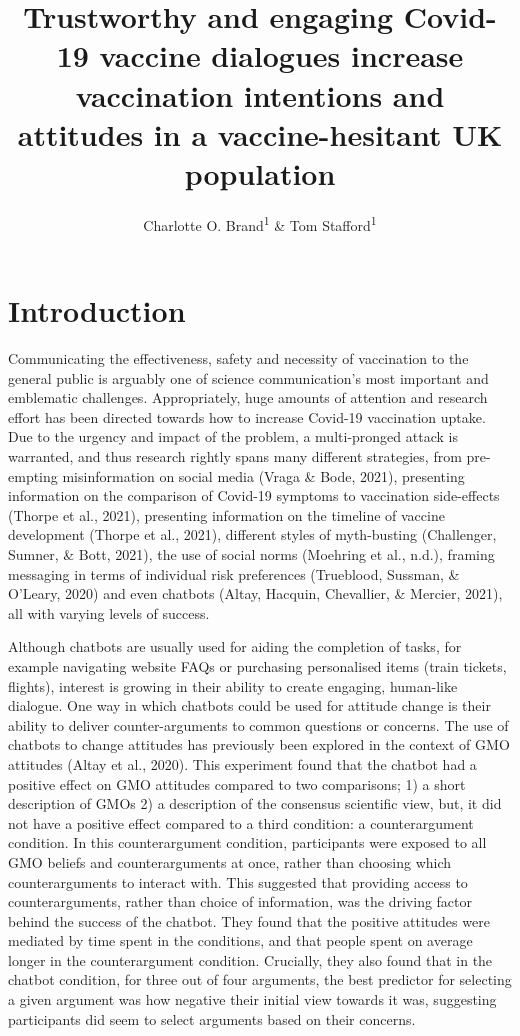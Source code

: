 \documentclass[
  english,
  ,jou,floatsintext]{apa6}
\title{Trustworthy and engaging Covid-19 vaccine dialogues increase vaccination intentions and attitudes in a vaccine-hesitant UK population}
\author{Charlotte O. Brand\textsuperscript{1} \& Tom Stafford\textsuperscript{1}}
\date{}
\affiliation{\vspace{0.5cm}\textsuperscript{1} University of Sheffield, Department of Psychology}
\begin{document}
\maketitle

\hypertarget{introduction}{%
\section{Introduction}\label{introduction}}

Communicating the effectiveness, safety and necessity of vaccination to the general public is arguably one of science communication's most important and emblematic challenges. Appropriately, huge amounts of attention and research effort has been directed towards how to increase Covid-19 vaccination uptake. Due to the urgency and impact of the problem, a multi-pronged attack is warranted, and thus research rightly spans many different strategies, from pre-empting misinformation on social media (Vraga \& Bode, 2021), presenting information on the comparison of Covid-19 symptoms to vaccination side-effects (Thorpe et al., 2021), presenting information on the timeline of vaccine development (Thorpe et al., 2021), different styles of myth-busting (Challenger, Sumner, \& Bott, 2021), the use of social norms (Moehring et al., n.d.), framing messaging in terms of individual risk preferences (Trueblood, Sussman, \& O'Leary, 2020) and even chatbots (Altay, Hacquin, Chevallier, \& Mercier, 2021), all with varying levels of success.

Although chatbots are usually used for aiding the completion of tasks, for example navigating website FAQs or purchasing personalised items (train tickets, flights), interest is growing in their ability to create engaging, human-like dialogue. One way in which chatbots could be used for attitude change is their ability to deliver counter-arguments to common questions or concerns. The use of chatbots to change attitudes has previously been explored in the context of GMO attitudes (Altay et al., 2020). This experiment found that the chatbot had a positive effect on GMO attitudes compared to two comparisons; 1) a short description of GMOs 2) a description of the consensus scientific view, but, it did not have a positive effect compared to a third condition: a counterargument condition. In this counterargument condition, participants were exposed to all GMO beliefs and counterarguments at once, rather than choosing which counterarguments to interact with. This suggested that providing access to counterarguments, rather than choice of information, was the driving factor behind the success of the chatbot. They found that the positive attitudes were mediated by time spent in the conditions, and that people spent on average longer in the counterargument condition. Crucially, they also found that in the chatbot condition, for three out of four arguments, the best predictor for selecting a given argument was how negative their initial view towards it was, suggesting participants did seem to select arguments based on their concerns.
\end{document}
